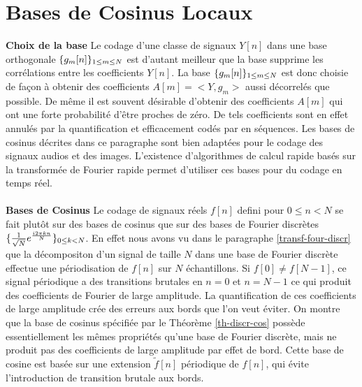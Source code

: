 \section{Bases de Cosinus Locaux}

{\bf Choix de la base}
Le codage d'une classe de signaux $Y[n]$ dans une base
orthogonale $\{g_m [n]\}_{ 1 \leq m \leq N}$ est d'autant meilleur que la base
supprime les corr\'elations entre les coefficients $Y[n]$.
La base $\{g_m [n]\}_{ 1 \leq m \leq N}$ est donc choisie de fa\c con \`a obtenir des
coefficients $A[m] = <Y,g_m>$ aussi d\'ecorrel\'es que possible.
De m\^eme il est souvent d\'esirable d'obtenir des coefficients
$A[m]$ qui ont une forte probabilit\'e d'\^etre proches de z\'ero.
De tels coefficients sont en effet annul\'es par la quantification
et efficacement cod\'es par en s\'equences.
Les bases de cosinus d\'ecrites dans ce paragraphe sont bien
adapt\'ees pour le codage des signaux audios et des images.
L'existence d'algorithmes de calcul rapide bas\'es sur la transform\'ee
de Fourier rapide permet d'utiliser ces bases pour du codage
en temps r\'eel.
\\
\\
{\bf Bases de Cosinus}
Le codage de signaux r\'eels
$f[n]$ defini pour $0 \leq n < N$
se fait plut\^ot sur des bases de
cosinus que sur des bases de Fourier discr\`etes
$\{\frac 1 {\sqrt N} e ^{\frac {i2 \pi k n} N } \}_{ 0 \leq k < N}$.
En effet nous avons vu dans le paragraphe \ref{transf-four-discr}
que la d\'ecompositon d'un signal de taille $N$ dans une base
de Fourier discr\`ete effectue une p\'eriodisation de $f[n]$ sur
$N$ \'echantillons. Si $f[0] \neq f[N-1]$, ce signal p\'eriodique
a des transitions brutales en $n=0$ et $n=N-1$ ce qui produit des
coefficients de Fourier de large amplitude. La quantification
de ces coefficients de large amplitude cr\'ee des erreurs aux
bords que l'on veut \'eviter. 
On montre que la base
de cosinus sp\'ecifi\'ee par le Th\'eor\`eme 
\ref{th-discr-cos} poss\`ede essentiellement
les m\^emes propri\'et\'es 
qu'une base de Fourier discr\`ete, mais ne 
produit 
pas des coefficients de large amplitude par effet de bord.
Cette base de cosine est bas\'ee sur une extension $\tilde f [n]$
p\'eriodique de $f[n]$,
qui \'evite l'introduction de transition brutale aux bords.

